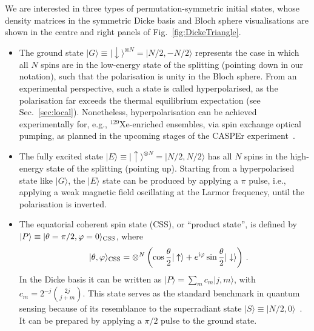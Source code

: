 \documentclass[aps,prd,10pt,twocolumn,superscriptaddress,floatfix,nofootinbib,amsmath,amssymb,altaffilletter,preprintnumbers]{revtex4-1}
\begin{document}
We are interested in three types of permutation-symmetric initial states, whose density matrices in the symmetric Dicke basis and Bloch sphere visualisations are shown in the centre and right panels of Fig.~\ref{fig:DickeTriangle}.
\begin{itemize}
    \item The ground state $\vert G\rangle\equiv\vert\downarrow\rangle^{\otimes N}=\vert N/2,-N/2\rangle$ represents the case in which all $N$ spins are in the low-energy state of the splitting (pointing down in our notation), such that the polarisation is unity in the Bloch sphere. From an experimental perspective, such a state is called hyperpolarised, as the polarisation far exceeds the thermal equilibrium expectation (see  Sec.~\ref{sec:local}).  Nonetheless, hyperpolarisation can be achieved experimentally for, e.g., $^{129}$Xe-enriched ensembles, via spin exchange optical pumping, as planned in the upcoming stages of the CASPEr experiment~\cite{Walter:2025ldb}. 
    
    \item The fully excited state $\vert E \rangle\equiv\vert\uparrow\rangle^{\otimes N}=\vert N/2,N/2\rangle$ has all $N$ spins in the high-energy state of the splitting (pointing up). Starting from a hyperpolarised state like $\vert G\rangle$, the $\vert E\rangle$ state can be produced by applying a $\pi$ pulse, i.e., applying a weak magnetic field oscillating at the Larmor frequency, until the polarisation is inverted.

    \item The equatorial coherent spin state (CSS), or ``product state'', is defined by $\vert P\rangle\equiv\vert \theta=\pi/2,\varphi=0 \rangle_{\rm CSS}$, where
\begin{align}
\qquad \vert \theta, \varphi \rangle_{\rm CSS}& =\otimes^{N}\left(\cos\frac{\theta}{2}\vert\uparrow\rangle+e^{{\rm i}\varphi}\sin \frac{\theta}{2}\vert\downarrow\rangle\right)\, .
\end{align}
    In the Dicke basis it can be written as $\vert P\rangle=\sum_m c_m\vert j, m\rangle$, with 
$c_m=2^{-j} \binom{2j}{j+m}$.
    This state serves as the standard benchmark in quantum sensing because of its resemblance to the superradiant state $\vert S\rangle\equiv\vert N/2,0\rangle$~\cite{PhysRev.93.99}. It can be prepared by applying a $\pi/2$ pulse to the ground state.
\end{itemize} 
\end{document}
